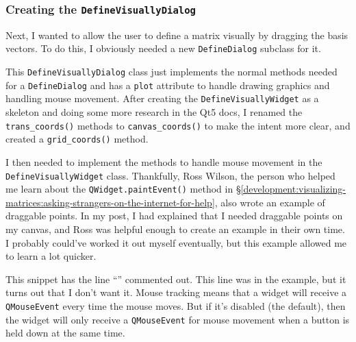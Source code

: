 \documentclass[../development.tex]{subfiles}
\begin{document}

\subsubsection{Creating the \texttt{DefineVisuallyDialog}\label{development:improving-the-gui:creating-the-DefineVisuallyDialog}}

Next, I wanted to allow the user to define a matrix visually by dragging the basis vectors. To do this, I obviously needed a new \texttt{DefineDialog} subclass for it.


This \texttt{DefineVisuallyDialog} class just implements the normal methods needed for a \texttt{DefineDialog} and has a \texttt{plot} attribute to handle drawing graphics and handling mouse movement. After creating the \texttt{DefineVisuallyWidget} as a skeleton and doing some more research in the Qt5 docs\cite{qt5-docs-qwidget-mousemoveevent}, I renamed the \texttt{trans_coords()} methods to \texttt{canvas_coords()} to make the intent more clear, and created a \texttt{grid_coords()} method.


I then needed to implement the methods to handle mouse movement in the \texttt{DefineVisuallyWidget} class. Thankfully, Ross Wilson, the person who helped me learn about the \texttt{QWidget.paintEvent()} method in \S\ref{development:visualizing-matrices:asking-strangers-on-the-internet-for-help}, also wrote an example of draggable points\cite{gitlab-custom-widgets-ijvectors.py}. In my post, I had explained that I needed draggable points on my canvas, and Ross was helpful enough to create an example in their own time. I probably could've worked it out myself eventually, but this example allowed me to learn a lot quicker.


This snippet has the line \enquote{} commented out. This line was in the example, but it turns out that I don't want it. Mouse tracking means that a widget will receive a \texttt{QMouseEvent} every time the mouse moves. But if it's disabled (the default), then the widget will only receive a \texttt{QMouseEvent} for mouse movement when a button is held down at the same time.
\end{document}
